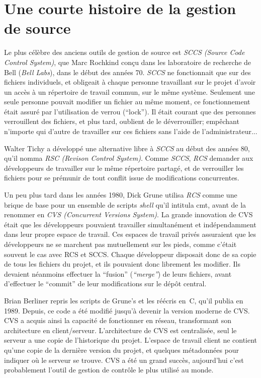 \section{Une courte histoire de la gestion de source}

Le plus célèbre des anciens outils de gestion de source est \textit{SCCS
(Source Code Control System)}, que Marc Rochkind conçu dans les laboratoire de
recherche de Bell (\textit{Bell Labs}), dans le début des années 70.
\textit{SCCS} ne fonctionnait que sur des fichiers individuels, et obligeait à
chaque personne travaillant sur le projet d'avoir un accès à un répertoire de
travail commun, sur le même système.  Seulement une seule personne pouvait
modifier un fichier au même moment, ce fonctionnement était assuré par
l'utilisation de verrou (``lock''). Il était courant que des personnes
verrouillent des fichiers, et plus tard, oublient de le déverrouiller;
empêchant n'importe qui d'autre de travailler sur ces fichiers sans l'aide de
l'administrateur...

Walter Tichy a développé une alternative libre à \textit{SCCS} au début des
années 80, qu'il nomma \textit{RSC (Revison Control System)}.  Comme
\textit{SCCS}, \textit{RCS} demander aux développeurs de travailler sur le même
répertoire partagé, et de verrouiller les
fichiers pour se prémunir de tout conflit issue de modifications concurrentes.

Un peu plus tard dans les années 1980, Dick Grune utilisa \textit{RCS} comme
une brique de base pour un ensemble de scripts \textit{shell} qu'il intitula
cmt, avant de la renommer en \textit{CVS (Concurrent Versions System)}.  La
grande innovation de CVS était que les développeurs pouvaient travailler
simultanément et indépendamment dans leur propre espace de travail. Ces espaces
de travail privés assuraient que les développeurs ne se marchent pas
mutuellement sur les pieds, comme c'était souvent le cas avec RCS et SCCS.
Chaque développeur disposait donc de sa copie de tous les fichiers du projet,
et ils pouvaient donc librement les modifier. Ils devaient néanmoins effectuer
la ``fusion'' (\textit{``merge''}) de leurs fichiers, avant d'effectuer le
``commit'' de leur modifications sur le dépôt central.

Brian Berliner repris les scripts de Grune's et les réécris en~C, qu'il publia
en 1989. Depuis, ce code a été modifié jusqu'à devenir la version moderne de
CVS. CVS a acquis ainsi la capacité de fonctionner en réseau, transformant son
architecture en client/serveur. L'architecture de CVS est centralisée, seul le
serveur a une copie de l'historique du projet. L'espace de travail client ne
contient qu'une copie de la dernière version du projet, et quelques métadonnées
pour indiquer où le serveur se trouve. CVS a été un grand succès, aujourd'hui
c'est probablement l'outil de gestion de contrôle le plus utilisé au monde. 

